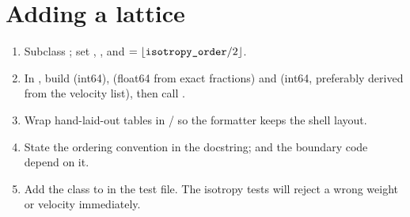 \section{Adding a lattice}

\begin{enumerate}[nosep]
\item Subclass ; set , ,  and
       $= \lfloor\texttt{isotropy\_order}/2\rfloor$.
\item In , build  (int64),  (float64 from exact
      fractions) and  (int64, preferably derived from the velocity list), then call
      .
\item Wrap hand-laid-out tables in  /  so the formatter
      keeps the shell layout.
\item State the ordering convention in the docstring;  and the boundary code depend
      on it.
\item Add the class to  in the test file. The isotropy tests will reject a
      wrong weight or velocity immediately.
\end{enumerate}
